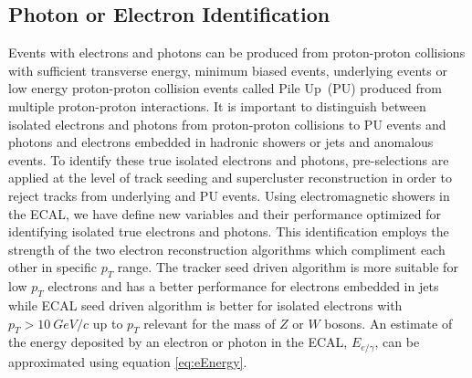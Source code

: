 \subsection{Photon or Electron Identification}
Events with electrons and photons can be produced from proton-proton collisions with sufficient transverse energy, minimum biased events, underlying events or low energy proton-proton collision events called Pile Up~(PU) produced from multiple proton-proton interactions.
It is important to distinguish between isolated electrons and photons from proton-proton collisions to PU events and photons and electrons embedded in hadronic showers or jets and anomalous events.  To identify these true isolated electrons and photons, pre-selections are applied at the level of track seeding and supercluster reconstruction in order to reject tracks from underlying and PU events.
Using electromagnetic showers in the ECAL, we have define new variables and their performance optimized for identifying isolated true electrons and photons. This identification employs the strength of the two electron reconstruction algorithms which compliment each other in specific $p_{T}$ range. The tracker seed driven algorithm is more suitable for low $p_{T}$ electrons and has a better performance for electrons embedded in jets while ECAL seed driven algorithm is better for isolated  electrons with
$p_{T} > 10~GeV/c$  up to $p_{T}$ relevant for the mass of $Z$ or $W$ bosons.
\newline
An estimate of the energy deposited by an electron or photon in the ECAL, $E_{e/\gamma}$, can be approximated using equation \ref{eq:eEnergy}. 

